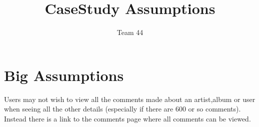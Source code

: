 \documentclass{article}
\title{CaseStudy Assumptions}
\author{Team 44}
\begin{document}
\section{Big Assumptions}
Users may not wish to view all the comments made about an artist,album or user when seeing all the other details (especially if there are 600 or so comments). Instead there is a link to the comments page where all comments can be viewed.
\end{document}
